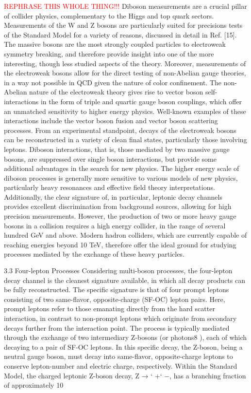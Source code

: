 \textcolor{red}{REPHRASE THIS WHOLE THING!!!}
Diboson measurements are a crucial pillar of collider physics, complementary to the Higgs and top quark sectors. Measurements of the W and Z bosons are particularly suited for precisions tests of the Standard Model for a variety of reasons, discussed in detail in Ref. [15]. The massive bosons are the most strongly coupled particles to electroweak symmetry breaking, and therefore provide insight into one of the more interesting, though less studied aspects of the theory. Moreover, measurements of the electroweak bosons allow for the direct testing of non-Abelian gauge theories, in a way not possible in QCD given the nature of color confinement. The non-Abelian nature of the electroweak theory gives rise to vector boson self-interactions in the form of triple and quartic gauge boson couplings, which offer an unmatched sensitivity to higher energy physics. Well-known examples of these interactions include the vector boson fusion and vector boson scattering processes. From an experimental standpoint, decays of the electroweak bosons can be reconstructed in a variety of clean final states, particularly those involving leptons. Diboson interactions, that is, those mediated by two massive gauge bosons, are suppressed over single boson interactions, but provide some additional advantages in the search for new physics. The higher energy scale of diboson processes is generally more sensitive to various models of new physics, particularly heavy resonances and effective field theory interpretations. Additionally, the clear signature of, in particular, leptonic decay channels provides excellent discrimination from background sources, allowing for high precision measurements. However, the production of two or more heavy gauge bosons in a collision requires a high energy collider, in the range of several hundred GeV and above. Modern hadron colliders, which are currently capable of reaching energies beyond 10 TeV, therefore offer the ideal ground for studying processes mediated by the exchange of these heavy particles.

3.3 Four-lepton Processes Considering multi-boson processes, the four-lepton decay channel is the cleanest signature available, in which all decay products can be fully reconstructed. The specific signature is that of four prompt leptons consisting of two same-flavor, opposite-charge (SF-OC) lepton pairs. Here, prompt leptons refer to those emanating directly from the hard scatter interaction, in contrast to non-prompt leptons which originate from secondary decays further from the interaction point. The process is typically mediated through the exchange of two intermediary Z-bosons (or photons8 ), each of which decaying to a pair of SF-OC leptons. In this specific decay, the Z-boson, being a neutral gauge boson, must decay into same-flavor, opposite-charge leptons to conserve lepton-number and electric charge, respectively. Within the Standard Model, the charged leptonic Z-boson decay, Z → ` +` −, has a branching fraction of approximately 10%

